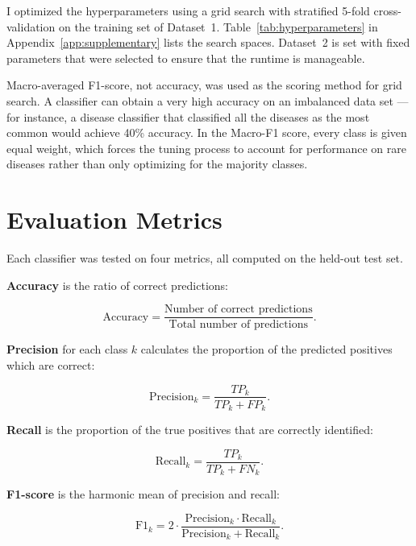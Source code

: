 I optimized the hyperparameters using a grid search with stratified 5-fold cross-validation on the training set of Dataset~1. Table~\ref{tab:hyperparameters} in Appendix~\ref{app:supplementary} lists the search spaces. Dataset~2 is set with fixed parameters that were selected to ensure that the runtime is manageable.

Macro-averaged F1-score, not accuracy, was used as the scoring method for grid search. A classifier can obtain a very high accuracy on an imbalanced data set --- for instance, a disease classifier that classified all the diseases as the most common would achieve 40\% accuracy. In the Macro-F1 score, every class is given equal weight, which forces the tuning process to account for performance on rare diseases rather than only optimizing for the majority classes.

\section{Evaluation Metrics}
\label{sec:evaluation_metrics}

Each classifier was tested on four metrics, all computed on the held-out test set.

\textbf{Accuracy} is the ratio of correct predictions:

\begin{equation}
\label{eq:accuracy}
\text{Accuracy} = \frac{\text{Number of correct predictions}}{\text{Total number of predictions}}.
\end{equation}

\textbf{Precision} for each class $k$ calculates the proportion of the predicted positives which are correct:

\begin{equation}
\label{eq:precision}
\text{Precision}_k = \frac{TP_k}{TP_k + FP_k}.
\end{equation}

\textbf{Recall} is the proportion of the true positives that are correctly identified:

\begin{equation}
\label{eq:recall}
\text{Recall}_k = \frac{TP_k}{TP_k + FN_k}.
\end{equation}

\textbf{F1-score} is the harmonic mean of precision and recall:

\begin{equation}
\label{eq:f1}
\text{F1}_k = 2 \cdot \frac{\text{Precision}_k \cdot \text{Recall}_k}{\text{Precision}_k + \text{Recall}_k}.
\end{equation}

